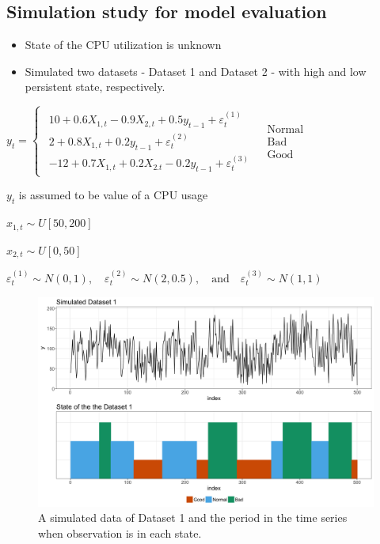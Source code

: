 \documentclass{beamer}
\begin{document}
\subsection{Simulation study for model evaluation}
\begin{frame}
\begin{itemize}
	\item State of the CPU utilization is unknown
	\pause
	
	\item Simulated two datasets - Dataset 1 and Dataset 2 - with high and low persistent state, respectively.
\end{itemize}

$y_{t}=\begin{cases}
	\begin{array}{c}
		10+0.6X_{1,t}-0.9X{}_{2,t}+0.5y_{t-1}+\varepsilon_{t}^{(1)}\\
		2+0.8X_{1,t}+0.2y_{t-1}+\varepsilon_{t}^{(2)}\\
		-12+0.7X_{1,t}+0.2X{}_{2.t}-0.2y_{t-1}+\varepsilon_{t}^{(3)}
	\end{array} & \begin{array}{c}
		\mathrm{Normal}\\
		\mathrm{Bad}\\
		\mathrm{Good}
\end{array}\end{cases}$
\vspace{1em}

$y_{t}$ is assumed to be value of a CPU usage

$x_{1,t}\sim U[50,200]$

$x_{2,t}\sim U[0,50]$ 

$\varepsilon_{t}^{(1)}\sim N(0,1),\quad \varepsilon_{t}^{(2)}\sim N(2,0.5),\quad \mathrm{and} \quad \varepsilon_{t}^{(3)}\sim N(1,1)$

\end{frame}

\begin{frame}

\begin{figure}
	\includegraphics[width=1\linewidth]{sim1}
	\caption{A simulated data of Dataset 1 and the period in the time series when observation is in each state.}
\end{figure}

\end{frame}
\end{document}
